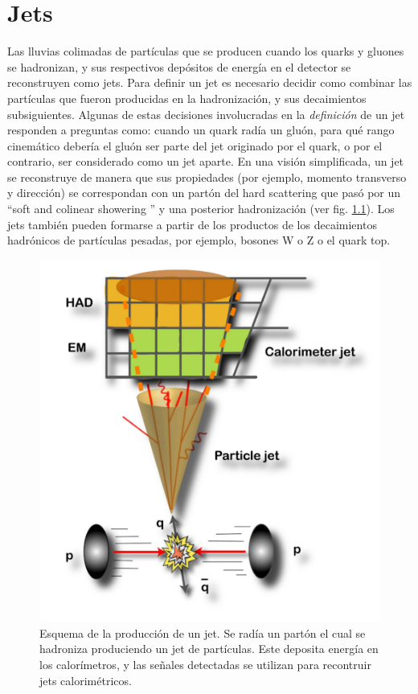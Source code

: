 \chapter{Jets}\label{jets}


Las lluvias colimadas de partículas que se producen cuando los quarks y gluones se hadronizan, y sus respectivos depósitos de energía en el detector se reconstruyen como jets. Para definir un jet es necesario decidir como combinar las partículas que fueron producidas en la hadronización, y sus decaimientos subsiguientes. Algunas de estas decisiones involucradas en la \emph{definición} de un jet responden a preguntas como: cuando un quark radía un gluón, para qué rango cinemático debería el gluón ser parte del jet originado por el quark, o por el contrario, ser considerado como un jet aparte. En una visión simplificada, un jet se reconstruye de manera que sus propiedades (por ejemplo, momento transverso y dirección) se correspondan con un partón del hard scattering que pasó por un ``soft and colinear showering '' y una posterior hadronización (ver fig. \ref{fig:jetScheme}). Los jets también pueden formarse a partir de los productos de los decaimientos hadrónicos de partículas pesadas, por ejemplo, bosones W o Z o el quark top.

\begin{figure}[h]
    \centering
    \includegraphics[width =0.6\linewidth]{images/jetScheme}
    \caption{Esquema de la producción de un jet. Se radía un partón el cual se hadroniza produciendo un jet de partículas. Este deposita energía en los calorímetros, y las señales detectadas se utilizan para recontruir jets calorimétricos.}
    \label{fig:jetScheme}
\end{figure}

